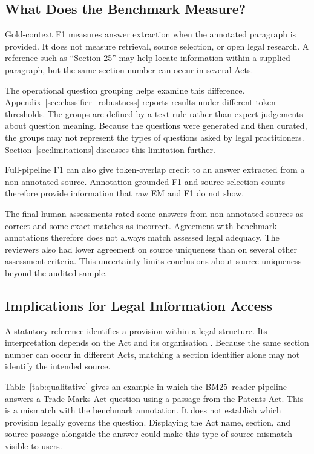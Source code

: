\documentclass[pdflatex,sn-basic]{sn-jnl}%
\theoremstyle{thmstyleone}%
\theoremstyle{thmstyletwo}%
\theoremstyle{thmstylethree}%
\begin{document}
\subsection{What Does the Benchmark Measure?}

Gold-context F1 measures answer extraction when the annotated paragraph is
provided. It does not measure retrieval, source selection, or open legal
research. A reference such as ``Section 25'' may help locate information
within a supplied paragraph, but the same section number can occur in several
Acts.

The operational question grouping helps examine this difference.
Appendix~\ref{sec:classifier_robustness} reports results under different token
thresholds. The groups are defined by a text rule rather than expert
judgements about question meaning. Because the questions were generated and
then curated, the groups may not represent the types of questions asked by
legal practitioners. Section~\ref{sec:limitations} discusses this limitation
further.

Full-pipeline F1 can also give token-overlap credit to an answer extracted
from a non-annotated source. Annotation-grounded F1 and source-selection
counts therefore provide information that raw EM and F1 do not show.

The final human assessments rated some answers from non-annotated sources as
correct and some exact matches as incorrect. Agreement with benchmark
annotations therefore does not always match assessed legal adequacy. The
reviewers also had lower agreement on source uniqueness than on several other
assessment criteria. This uncertainty limits conclusions about source
uniqueness beyond the audited sample.

\subsection{Implications for Legal Information Access}

A statutory reference identifies a provision within a legal structure. Its
interpretation depends on the Act and its organisation
\citep{louisFindingLaw2023,noceJuriFindITItalian2026}. Because the same
section number can occur in different Acts, matching a section identifier
alone may not identify the intended source.

Table~\ref{tab:qualitative} gives an example in which the BM25--reader
pipeline answers a Trade Marks Act question using a passage from the Patents
Act. This is a mismatch with the benchmark annotation. It does not establish
which provision legally governs the question. Displaying the Act name,
section, and source passage alongside the answer could make this type of
source mismatch visible to users.
\end{document}
